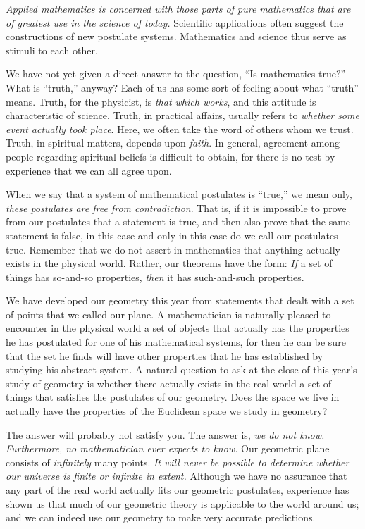\documentclass[11pt]{book}
\theoremstyle{bkplain}
\theoremstyle{XIplainnote}
\theoremstyle{bkplain}
\theoremstyle{bkplain}
\begin{document}
\emph{Applied mathematics is concerned with those parts of pure mathematics
that are of greatest use in the science of today.} Scientific applications
often suggest the constructions of new postulate systems. Mathematics and
science thus serve as stimuli to each other.

We have not yet given a direct answer to the question, ``Is mathematics
true?'' What is ``truth,'' anyway? Each of us has some sort of feeling about
what ``truth'' means. Truth, for the physicist, is \emph{that which works},
and this attitude is characteristic of science. Truth, in practical affairs,
usually refers to \emph{whether some event actually took place}. Here, we
often take the word of others whom we trust. Truth, in spiritual matters,
depends upon \emph{faith}. In general, agreement among people regarding
spiritual beliefs is difficult to obtain, for there is no test by experience
that we can all agree upon.

When we say that a system of mathematical postulates is ``true,'' we mean
only, \emph{these postulates are free from contradiction}. That is, if it is
impossible to prove from our postulates that a statement is true, and then
also prove that the same statement is false, in this case and only in this
case do we call our postulates true. Remember that we do not assert in
mathematics that anything actually exists in the physical world. Rather, our
theorems have the form: \emph{If} a set of things has so-and-so properties,
\emph{then} it has such-and-such properties.

We have developed our geometry this year from statements that dealt with a set
of points that we called our plane. A mathematician is naturally pleased to
encounter in the physical world a set of objects that actually has the
properties he has postulated for one of his mathematical systems, for then he
can be sure that the set he finds will have other properties that he has
established by studying his abstract system. A natural question to ask at the
close of this year's study of geometry is whether there actually exists in the
real world a set of things that satisfies the postulates of our geometry. Does
the space we live in actually have the properties of the Euclidean space we
study in geometry?

The answer will probably not satisfy you. The answer is, \emph{we do not know.
Furthermore, no mathematician ever expects to know.} Our geometric plane
consists of \emph{infinitely} many points. \emph{It will never be possible to
determine whether our universe is finite or infinite in extent.} Although we
have no assurance that any part of the real world actually fits our geometric
postulates, experience has shown us that much of our geometric theory is
applicable to the world around us; and we can indeed use our geometry to make
very accurate predictions.
\end{document}

